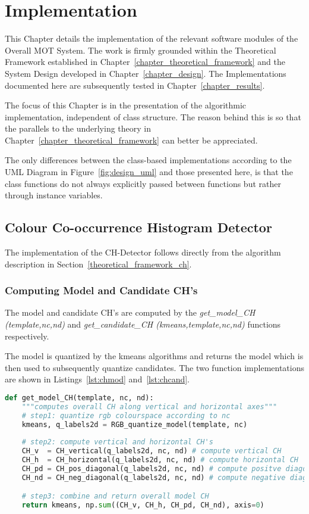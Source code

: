 \chapter{Implementation}\label{chapter_implementation}

This Chapter details the implementation of the relevant software modules of the
Overall MOT System. The work is firmly grounded within the Theoretical Framework
established in Chapter~\ref{chapter_theoretical_framework} and the System Design
developed in Chapter~\ref{chapter_design}. The Implementations documented here
are subsequently tested in Chapter~\ref{chapter_results}.

The focus of this Chapter is in the presentation of the algorithmic
implementation, independent of class structure. The reason behind this is so
that the parallels to the underlying theory in
Chapter~\ref{chapter_theoretical_framework} can better be appreciated.

The only differences between the class-based implementations according to the
UML Diagram in Figure~\ref{fig:design_uml} and those presented here, is that the
class functions do not always explicitly passed between functions but rather
through instance variables. 

\section{Colour Co-occurrence Histogram Detector}\label{implementation_ch}
The implementation of the CH-Detector follows directly from the algorithm
description in Section~\ref{theoretical_framework_ch}.

\subsection{Computing Model and Candidate CH's}
The model and candidate CH's are computed by the \textit{get\_model\_CH
(template,nc,nd)} and \textit{get\_candidate\_CH (kmeans,template,nc,nd)}
functions respectively.

The model is quantized by the kmeans algorithms and returns the model which is
then used to subsequently quantize candidates. The two function implementations
are shown in Listings~\ref{lst:chmod} and~\ref{lst:chcand}.

\begin{lstlisting}[language=Python, caption={Computing model CH}, captionpos=b, label={lst:chmod}]
def get_model_CH(template, nc, nd):
    """computes overall CH along vertical and horizontal axes"""
    # step1: quantize rgb colourspace according to nc
    kmeans, q_labels2d = RGB_quantize_model(template, nc)
    
    # step2: compute vertical and horizontal CH's
    CH_v  = CH_vertical(q_labels2d, nc, nd) # compute vertical CH
    CH_h  = CH_horizontal(q_labels2d, nc, nd) # compute horizontal CH
    CH_pd = CH_pos_diagonal(q_labels2d, nc, nd) # compute positve diagonal CH
    CH_nd = CH_neg_diagonal(q_labels2d, nc, nd) # compute negative diagonal CH

    # step3: combine and return overall model CH
    return kmeans, np.sum((CH_v, CH_h, CH_pd, CH_nd), axis=0)
\end{lstlisting}

